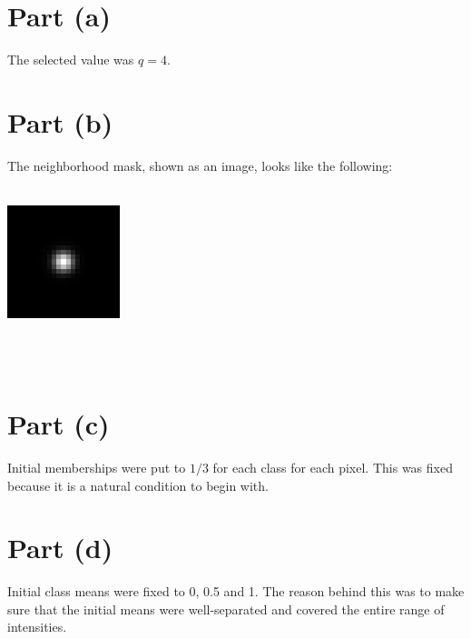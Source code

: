 \documentclass[11pt]{article}
\begin{document}
\maketitle
\section*{Part (a)}
The selected value was $q=4$.

\section*{Part (b)}
The neighborhood mask, shown as an image, looks like the following: \\ \\
\centerline{\includegraphics[scale=1]{weights}} \\ \\

\section*{Part (c)}
Initial memberships were put to $1/3$ for each class for each pixel. This was fixed because it is a natural condition to begin with.

\section*{Part (d)}
Initial class means were fixed to 0, 0.5 and 1. The reason behind this was to make sure that the initial means were well-separated and covered the entire range of intensities.
\end{document}
